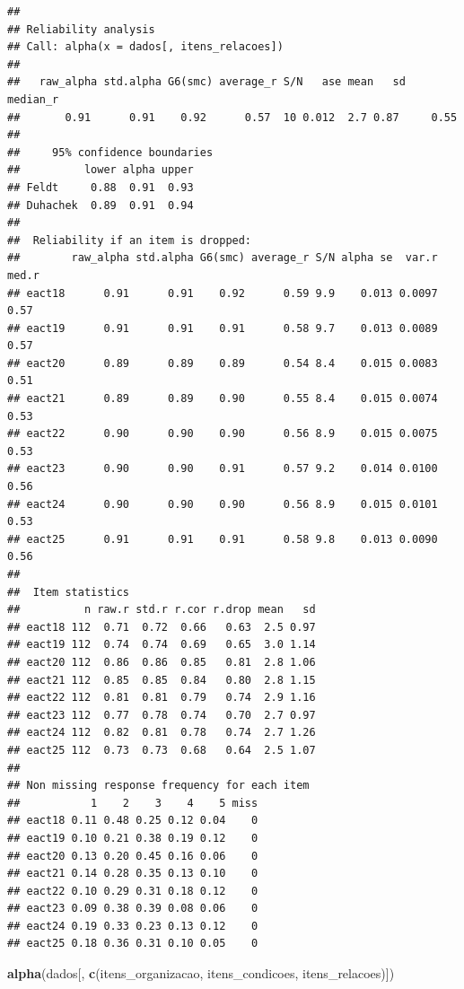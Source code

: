\documentclass[
]{article}
\newenvironment{Shaded}{\begin{snugshade}}{\end{snugshade}}
\newcommand{\FunctionTok}[1]{\textcolor[rgb]{0.13,0.29,0.53}{\textbf{#1}}}
\newcommand{\NormalTok}[1]{#1}
\begin{document}
\begin{verbatim}
## 
## Reliability analysis   
## Call: alpha(x = dados[, itens_relacoes])
## 
##   raw_alpha std.alpha G6(smc) average_r S/N   ase mean   sd median_r
##       0.91      0.91    0.92      0.57  10 0.012  2.7 0.87     0.55
## 
##     95% confidence boundaries 
##          lower alpha upper
## Feldt     0.88  0.91  0.93
## Duhachek  0.89  0.91  0.94
## 
##  Reliability if an item is dropped:
##        raw_alpha std.alpha G6(smc) average_r S/N alpha se  var.r med.r
## eact18      0.91      0.91    0.92      0.59 9.9    0.013 0.0097  0.57
## eact19      0.91      0.91    0.91      0.58 9.7    0.013 0.0089  0.57
## eact20      0.89      0.89    0.89      0.54 8.4    0.015 0.0083  0.51
## eact21      0.89      0.89    0.90      0.55 8.4    0.015 0.0074  0.53
## eact22      0.90      0.90    0.90      0.56 8.9    0.015 0.0075  0.53
## eact23      0.90      0.90    0.91      0.57 9.2    0.014 0.0100  0.56
## eact24      0.90      0.90    0.90      0.56 8.9    0.015 0.0101  0.53
## eact25      0.91      0.91    0.91      0.58 9.8    0.013 0.0090  0.56
## 
##  Item statistics 
##          n raw.r std.r r.cor r.drop mean   sd
## eact18 112  0.71  0.72  0.66   0.63  2.5 0.97
## eact19 112  0.74  0.74  0.69   0.65  3.0 1.14
## eact20 112  0.86  0.86  0.85   0.81  2.8 1.06
## eact21 112  0.85  0.85  0.84   0.80  2.8 1.15
## eact22 112  0.81  0.81  0.79   0.74  2.9 1.16
## eact23 112  0.77  0.78  0.74   0.70  2.7 0.97
## eact24 112  0.82  0.81  0.78   0.74  2.7 1.26
## eact25 112  0.73  0.73  0.68   0.64  2.5 1.07
## 
## Non missing response frequency for each item
##           1    2    3    4    5 miss
## eact18 0.11 0.48 0.25 0.12 0.04    0
## eact19 0.10 0.21 0.38 0.19 0.12    0
## eact20 0.13 0.20 0.45 0.16 0.06    0
## eact21 0.14 0.28 0.35 0.13 0.10    0
## eact22 0.10 0.29 0.31 0.18 0.12    0
## eact23 0.09 0.38 0.39 0.08 0.06    0
## eact24 0.19 0.33 0.23 0.13 0.12    0
## eact25 0.18 0.36 0.31 0.10 0.05    0
\end{verbatim}

\begin{Shaded}
\begin{Highlighting}[]
\FunctionTok{alpha}\NormalTok{(dados[, }\FunctionTok{c}\NormalTok{(itens\_organizacao, itens\_condicoes, itens\_relacoes)])}
\end{Highlighting}
\end{Shaded}
\end{document}
